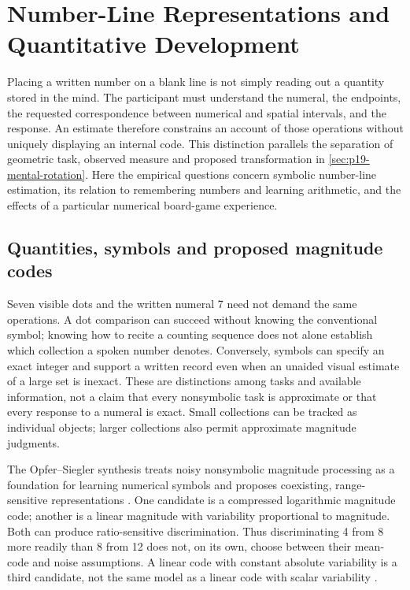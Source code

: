\chapter{Number-Line Representations and Quantitative Development}
\label{sec:p19-number-line-development}

Placing a written number on a blank line is not simply reading out a
quantity stored in the mind. The participant must understand the numeral,
the endpoints, the requested correspondence between numerical and spatial
intervals, and the response. An estimate therefore constrains an account
of those operations without uniquely displaying an internal code. This
distinction parallels the separation of geometric task, observed measure
and proposed transformation in \cref{sec:p19-mental-rotation}.
Here the empirical questions concern symbolic number-line estimation,
its relation to remembering numbers and learning arithmetic, and the
effects of a particular numerical board-game experience.

\section{Quantities, symbols and proposed magnitude codes}
\label{sec:p19-nl-quantities}

Seven visible dots and the written numeral 7 need not demand the same
operations. A dot comparison can succeed without knowing the conventional
symbol; knowing how to recite a counting sequence does not alone establish
which collection a spoken number denotes. Conversely, symbols can specify
an exact integer and support a written record even when an unaided visual
estimate of a large set is inexact. These are distinctions among tasks and
available information, not a claim that every nonsymbolic task is
approximate or that every response to a numeral is exact.
Small collections can be tracked as individual objects; larger collections
also permit approximate magnitude judgments.

The Opfer--Siegler synthesis treats noisy nonsymbolic magnitude processing
as a foundation for learning numerical symbols and proposes coexisting,
range-sensitive representations \cite[author draft, pp.~2--3,
10--15 and 21--28]{OpferSiegler2012QuantitativeDraftNL}.
One candidate is a compressed logarithmic magnitude code; another is a
linear magnitude with variability proportional to magnitude. Both can
produce ratio-sensitive discrimination. Thus discriminating 4 from 8 more
readily than 8 from 12 does not, on its own, choose between their mean-code
and noise assumptions. A linear code with constant absolute variability
is a third candidate, not the same model as a linear code with scalar
variability \cite[pp.~237--238]{SieglerOpfer2003EstimationNL}.

